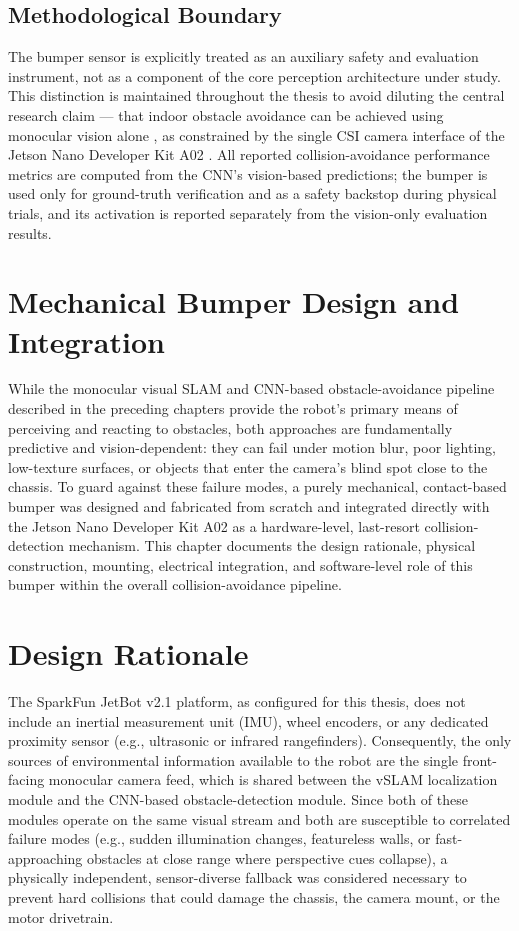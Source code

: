 \subsection{Methodological Boundary}

The bumper sensor is explicitly treated as an auxiliary safety and evaluation instrument, not as a component of the core perception architecture under study. This distinction is maintained throughout the thesis to avoid diluting the central research claim --- that indoor obstacle avoidance can be achieved using monocular vision alone \cite{Matthies:2017}, as constrained by the single CSI camera interface of the Jetson Nano Developer Kit A02 \cite{NVIDIA:2019}. All reported collision-avoidance performance metrics are computed from the CNN's vision-based predictions; the bumper is used only for ground-truth verification and as a safety backstop during physical trials, and its activation is reported separately from the vision-only evaluation results.

\section{Mechanical Bumper Design and Integration}
\label{sec:bumper}

While the monocular visual SLAM and CNN-based obstacle-avoidance pipeline described in the preceding chapters provide the robot's primary means of perceiving and reacting to obstacles, both approaches are fundamentally predictive and vision-dependent: they can fail under motion blur, poor lighting, low-texture surfaces, or objects that enter the camera's blind spot close to the chassis. To guard against these failure modes, a purely mechanical, contact-based bumper was designed and fabricated from scratch and integrated directly with the Jetson Nano Developer Kit A02 as a hardware-level, last-resort collision-detection mechanism. This chapter documents the design rationale, physical construction, mounting, electrical integration, and software-level role of this bumper within the overall collision-avoidance pipeline.

\section{Design Rationale}
\label{sec:bumper-rationale}

The SparkFun JetBot v2.1 platform, as configured for this thesis, does not include an inertial measurement unit (IMU), wheel encoders, or any dedicated proximity sensor (e.g., ultrasonic or infrared rangefinders). Consequently, the only sources of environmental information available to the robot are the single front-facing monocular camera feed, which is shared between the vSLAM localization module and the CNN-based obstacle-detection module. Since both of these modules operate on the same visual stream and both are susceptible to correlated failure modes (e.g., sudden illumination changes, featureless walls, or fast-approaching obstacles at close range where perspective cues collapse), a physically independent, sensor-diverse fallback was considered necessary to prevent hard collisions that could damage the chassis, the camera mount, or the motor drivetrain.


